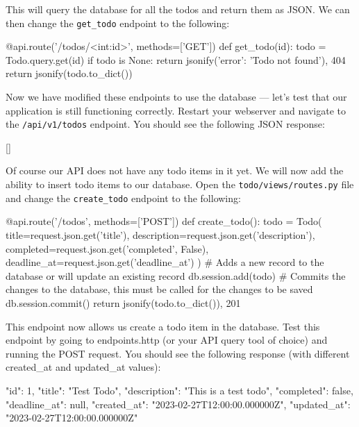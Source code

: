 \documentclass{csse4400}
\begin{document}
This will query the database for all the todos and return them as JSON.
We can then change the \texttt{get\_todo} endpoint to the following:

\begin{code}[language=python,numbers=none]{}
  @api.route('/todos/<int:id>', methods=['GET'])
  def get_todo(id):
      todo = Todo.query.get(id)
      if todo is None:
          return jsonify({'error': 'Todo not found'}), 404
      return jsonify(todo.to_dict())
\end{code}

Now we have modified these endpoints to use the database --- let's test that our application is still functioning correctly.
Restart your webserver and navigate to the \texttt{/api/v1/todos} endpoint.
You should see the following JSON response:

\begin{code}[language=json,numbers=none]{}
  []
\end{code}

Of course our API does not have any todo items in it yet.
We will now add the ability to insert todo items to our database.
Open the \texttt{todo/views/routes.py} file and change the \texttt{create\_todo} endpoint to the following:

\begin{code}[language=python,numbers=none]{}
  @api.route('/todos', methods=['POST'])
  def create_todo():
      todo = Todo(
          title=request.json.get('title'),
          description=request.json.get('description'),
          completed=request.json.get('completed', False),
          deadline_at=request.json.get('deadline_at')
      )
      # Adds a new record to the database or will update an existing record
      db.session.add(todo)
      # Commits the changes to the database, this must be called for the changes to be saved
      db.session.commit()
      return jsonify(todo.to_dict()), 201
\end{code}

This endpoint now allows us create a todo item in the database.
Test this endpoint by going to endpoints.http (or your API query tool of choice) and running the POST request.
You should see the following response (with different created\_at and updated\_at values):

\begin{code}[language=json,numbers=none]{}
  {
    "id": 1,
    "title": "Test Todo",
    "description": "This is a test todo",
    "completed": false,
    "deadline_at": null,
    "created_at": "2023-02-27T12:00:00.000000Z",
    "updated_at": "2023-02-27T12:00:00.000000Z"
  }
\end{code}
\end{document}
